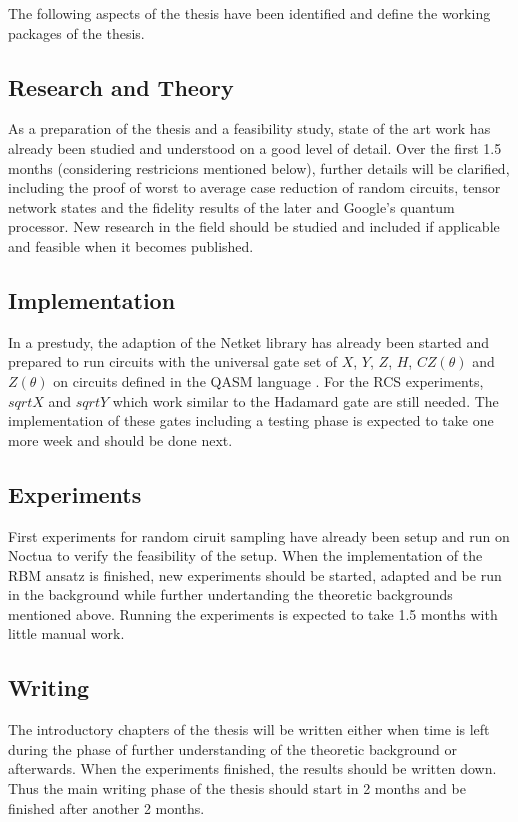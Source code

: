 The following aspects of the thesis have been identified and define the working packages of the thesis.

\subsection{Research and Theory}
As a preparation of the thesis and a feasibility study, state of the art work has already been studied 
and understood on a good level of detail. Over the first 1.5 months (considering restricions mentioned below), further details will be clarified, including 
the proof of worst to average case reduction of random circuits, tensor network states and the fidelity results 
of the later and Google's quantum processor. New research in the field should be studied and included if applicable and feasible when it becomes published.

\subsection{Implementation}
In a prestudy, the adaption of the Netket library has already been started and prepared to run circuits with 
the universal gate set of $X$, $Y$, $Z$, $H$, $CZ(\theta)$ and $Z(\theta)$ on circuits defined in the QASM language \cite{cross2017open}. For the RCS experiments, $sqrtX$ and $sqrtY$ which work similar to the Hadamard gate are still 
needed. The implementation of these gates including a testing phase is expected to take one more week and should
be done next.

\subsection{Experiments}
First experiments for random ciruit sampling have already been setup and run on Noctua to verify the feasibility of
the setup. When the implementation of the RBM ansatz is finished, new experiments should be started, adapted and be run in the 
background while further undertanding the theoretic backgrounds mentioned above. Running the experiments is expected 
to take 1.5 months with little manual work.

\subsection{Writing}
The introductory chapters of the thesis will be written either when time is left during the phase of further 
understanding of the theoretic background or afterwards. When the experiments finished, the results should be written
down. Thus the main writing phase of the thesis should start in 2 months and be finished after another 2 months.

